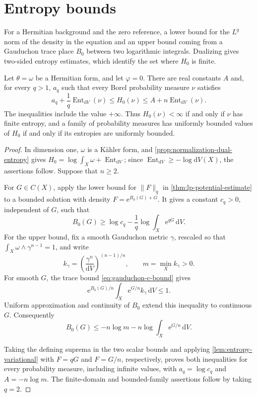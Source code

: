 \section{Entropy bounds}

For a Hermitian background and the zero reference, a lower bound for the $L^q$ norm of the density in the equation and an upper bound coming from a Gauduchon trace place $B_0$ between two logarithmic integrals. Dualizing gives two-sided entropy estimates, which identify the set where $H_0$ is finite.

\begin{proposition}\label{prop:hermitian-dual-entropy-bounds}
Let $\theta=\omega$ be a Hermitian form, and let $\varphi=0$. There are real constants $A$ and, for every $q>1$, $a_q$ such that every Borel probability measure $\nu$ satisfies
\[
 a_q+\frac1q\operatorname{Ent}_{\mathrm{d}V}(\nu)
 \leq H_0(\nu)
 \leq A+n\operatorname{Ent}_{\mathrm{d}V}(\nu).
\]
The inequalities include the value $+\infty$. Thus $H_0(\nu)<\infty$ if and only if $\nu$ has finite entropy, and a family of probability measures has uniformly bounded values of $H_0$ if and only if its entropies are uniformly bounded.
\end{proposition}
\begin{proof}
In dimension one, $\omega$ is a K\"ahler form, and \cref{prop:normalization-dual-entropy} gives $H_0=\log\int_X\omega+\operatorname{Ent}_{\mathrm{d}V}$; since $\operatorname{Ent}_{\mathrm{d}V}\geq-\log\mathrm{d}V(X)$, the assertions follow. Suppose that $n\geq2$.

For $G\in C(X)$, apply the lower bound for $\|F\|_q$ in \cref{thm:lp-potential-estimate} to a bounded solution with density $F=\mathrm{e}^{B_0(G)+G}$. It gives a constant $c_q>0$, independent of $G$, such that
\[
 B_0(G)\geq\log c_q-\frac1q\log\int_X\mathrm{e}^{qG}\,\mathrm{d}V.
\]
For the upper bound, fix a smooth Gauduchon metric $\gamma$, rescaled so that $\int_X\omega\wedge\gamma^{n-1}=1$, and write
\[
 k_\gamma=\left(\frac{\gamma^n}{\mathrm{d}V}\right)^{(n-1)/n},
 \qquad m=\min_X k_\gamma>0.
\]
For smooth $G$, the trace bound \eqref{eq:gauduchon-c-bound} gives
\[
 \mathrm{e}^{B_0(G)/n}\int_X\mathrm{e}^{G/n}k_\gamma\,\mathrm{d}V\leq1.
\]
Uniform approximation and continuity of $B_0$ extend this inequality to continuous $G$. Consequently
\[
 B_0(G)\leq-n\log m-n\log\int_X\mathrm{e}^{G/n}\,\mathrm{d}V.
\]

Taking the defining suprema in the two scalar bounds and applying \cref{lem:entropy-variational} with $F=qG$ and $F=G/n$, respectively, proves both inequalities for every probability measure, including infinite values, with $a_q=\log c_q$ and $A=-n\log m$. The finite-domain and bounded-family assertions follow by taking $q=2$.
\end{proof}




